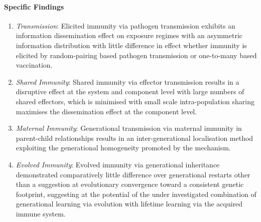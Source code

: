\paragraph{Specific Findings}
		\begin{enumerate}
			\item \emph{Transmission}: Elicited immunity via pathogen transmission exhibits an information dissemination effect on exposure regimes with an asymmetric information distribution with little difference in effect whether immunity is elicited by random-pairing based pathogen transmission or one-to-many based vaccination.
			\item \emph{Shared Immunity}: Shared immunity via effector transmission results in a disruptive effect at the system and component level with large numbers of shared effectors, which is minimised with small scale intra-population sharing maximises the dissemination effect at the component level.
			\item \emph{Maternal Immunity}: Generational transmission via maternal immunity in parent-child relationships results in an inter-generational localisation method exploiting the generational homogeneity promoted by the mechanism.
			\item \emph{Evolved Immunity}: Evolved immunity via generational inheritance demonstrated comparatively little difference over generational restarts other than a suggestion at evolutionary convergence toward a consistent genetic footprint, suggesting at the potential of the under investigated combination of generational learning via evolution with lifetime learning via the acquired immune system.
		\end{enumerate}

%
%
